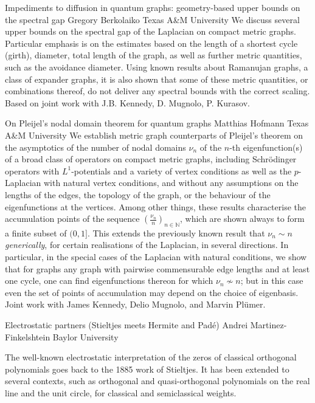 \begin{addmargin}[2em]{0em}
\vspace{1.5ex}
\abs
{Impediments to diffusion in quantum graphs: geometry-based upper
bounds on the spectral gap}
{Gregory Berkolaiko}
{Texas A\&M University}
{We discuss several upper bounds on the spectral gap of the Laplacian
on compact metric graphs. Particular emphasis is on the estimates
based on the length of a shortest cycle (girth), diameter, total
length of the graph, as well as further metric quantities, such as the
avoidance diameter. Using known results about Ramanujan graphs, a
class of expander graphs, it is also shown that some of these metric
quantities, or combinations thereof, do not deliver any spectral
bounds with the correct scaling.\\
Based on joint work with J.B. Kennedy, D. Mugnolo, P. Kurasov.}


\vspace{1.5ex}
\abs
{On Pleijel's nodal domain theorem for quantum graphs}
{Matthias Hofmann}
{Texas A\&M University}
{We establish metric graph counterparts of Pleijel's theorem on the asymptotics of the number of nodal domains $\nu_n$ of the $n$-th eigenfunction(s) of a broad class of operators on compact metric graphs, including Schr\"{o}dinger operators with $L^1$-potentials and a variety of vertex conditions as well as the $p$-Laplacian with natural vertex conditions, and without any assumptions on the lengths of the edges, the topology of the graph, or the behaviour of the eigenfunctions at the vertices. Among other things, these results characterise the accumulation points of the sequence $(\frac{\nu_n}{n})_{n\in\mathbb{N}}$, which are shown always to form a finite subset of $(0,1]$.
This extends the previously known result that $\nu_n\sim n$ \textit{generically}, for certain realisations of the Laplacian, in several directions. In particular, in the special cases of the Laplacian with natural conditions, we show that for graphs any graph with pairwise commensurable edge lengths and at least one cycle, one can find eigenfunctions thereon for which ${\nu_n}\not\sim {n}$; but in this case even the set of points of accumulation may depend on the choice of eigenbasis.\\
Joint work with James Kennedy, Delio Mugnolo, and Marvin Plümer.}



\vspace{1.5ex}
\abs
{Electrostatic partners (Stieltjes meets Hermite and Padé)}
{Andrei Martinez-Finkelshtein}
{Baylor University}
{The well-known electrostatic interpretation of the zeros of classical orthogonal polynomials goes back to the 1885 work of Stieltjes. It has been extended to several contexts, such as orthogonal and quasi-orthogonal polynomials on the real line and the unit circle, for classical and semiclassical weights.

}
\end{addmargin}
